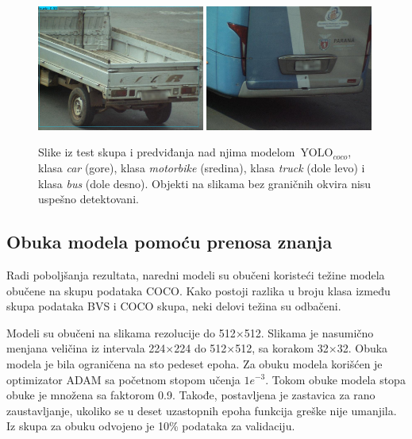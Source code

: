 \documentclass[12pt,oneside]{memoir}
\newcommand{\yolo}{\ensuremath{\,\textrm{YOLO}}}
\begin{document}
\begin{figure}[htbp]
      \includegraphics[width=0.49\textwidth]{matfmaster/yolo/v4/base/truck_0.jpg}
      \includegraphics[width=0.49\textwidth]{matfmaster/yolo/v4/base/bus_0.jpg}
    \caption{Slike iz test skupa i predviđanja nad njima modelom $\yolo_{coco}$, klasa \textit{car} (gore), klasa \textit{motorbike} (sredina),  klasa \textit{truck} (dole levo) i  klasa \textit{bus} (dole desno). Objekti na slikama bez graničnih okvira nisu uspešno detektovani.} \label{fig:YOLO4_COCO_predictions}
\end{figure}


\clearpage
\subsection{Obuka modela pomoću prenosa znanja}
Radi poboljšanja rezultata, naredni modeli su obučeni koristeći težine modela obučene na skupu podataka COCO. Kako postoji razlika u broju klasa između skupa podataka BVS i COCO skupa, neki delovi težina su odbačeni.

Modeli su obučeni na slikama rezolucije do 512$\times$512. Slikama je nasumično menjana veličina iz intervala 224$\times$224 do 512$\times$512, sa korakom 32$\times$32. Obuka modela je bila ograničena na sto pedeset epoha. Za obuku modela korišćen je optimizator ADAM sa početnom stopom učenja $1e^{-3}$. Tokom obuke modela stopa obuke je množena sa faktorom 0.9. Takođe, postavljena je zastavica za rano zaustavljanje, ukoliko se u deset uzastopnih epoha funkcija greške nije umanjila. Iz skupa za obuku odvojeno je 10\% podataka za validaciju. 
\end{document}

